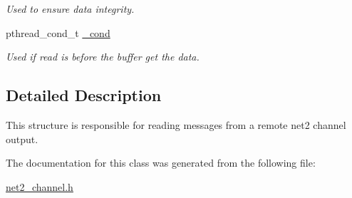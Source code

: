 \begin{DoxyCompactItemize}
\begin{DoxyCompactList}\small\item\em Used to ensure data integrity. \end{DoxyCompactList}\item 
\hypertarget{structnet2__channel__input__t_a1cd9ede6cdabb64e0381fa2eea57f71d}{pthread\-\_\-cond\-\_\-t \hyperlink{structnet2__channel__input__t_a1cd9ede6cdabb64e0381fa2eea57f71d}{\-\_\-cond}}\label{structnet2__channel__input__t_a1cd9ede6cdabb64e0381fa2eea57f71d}

\begin{DoxyCompactList}\small\item\em Used if read is before the buffer get the data. \end{DoxyCompactList}\end{DoxyCompactItemize}


\subsection{Detailed Description}
This structure is responsible for reading messages from a remote net2 channel output. 

The documentation for this class was generated from the following file\-:\begin{DoxyCompactItemize}
\item 
\hyperlink{net2__channel_8h}{net2\-\_\-channel.\-h}\end{DoxyCompactItemize}
